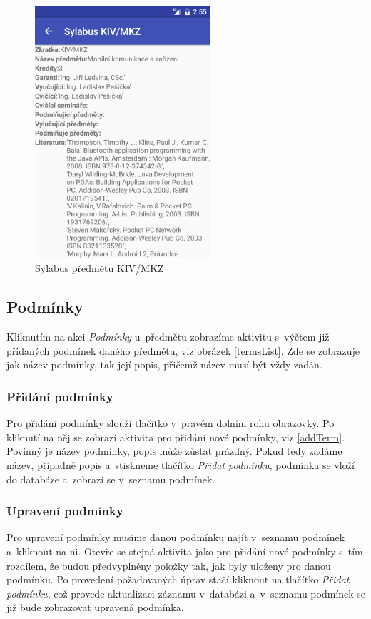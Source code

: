 \documentclass[12pt, a4paper]{article}
\begin{document}
		\begin{figure}[ht!]
			\centering
			\caption{Sylabus předmětu KIV/MKZ}
			\label{syllabus}
			\includegraphics[width=6.5cm]{img/syllabus.png}
		\end{figure}
		\FloatBarrier
		
		\subsection{Podmínky}
		Kliknutím na akci \emph{Podmínky} u~předmětu zobrazíme aktivitu s~výčtem již přidaných podmínek daného předmětu, viz obrázek \ref{termsList}. Zde se zobrazuje jak název podmínky, tak její popis, přičemž název musí být vždy zadán.
		
			\subsubsection{Přidání podmínky}
			Pro přidání podmínky slouží tlačítko  v~pravém dolním rohu obrazovky. Po kliknutí na něj se zobrazí aktivita pro přidání nové podmínky, viz \ref{addTerm}. Povinný je název podmínky, popis může zůstat prázdný. Pokud tedy zadáme název, případně popis a~stiskneme tlačítko \emph{Přidat podmínku}, podmínka se vloží do databáze a~zobrazí se v~seznamu podmínek.
			
			\subsubsection{Upravení podmínky}
			Pro upravení podmínky musíme danou podmínku najít v~seznamu podmínek a~kliknout na ni. Otevře se stejná aktivita jako pro přidání nové podmínky s~tím rozdílem, že budou předvyplněny položky tak, jak byly uloženy pro danou podmínku. Po provedení požadovaných úprav stačí kliknout na tlačítko \emph{Přidat podmínku}, což provede aktualizaci záznamu v~databázi a~v~seznamu podmínek se již bude zobrazovat upravená podmínka.
			
\end{document}
